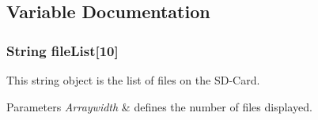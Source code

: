 \subsection{Variable Documentation}
\hypertarget{_c_n_c_interface_8ino_a5a05dbbdadb25aa91e63ea51a8a2ec14}{
\subsubsection[{file\-List}]{\setlength{\rightskip}{0pt plus 5cm}String file\-List\mbox{[}10\mbox{]}}}\label{_c_n_c_interface_8ino_a5a05dbbdadb25aa91e63ea51a8a2ec14}


This string object is the list of files on the S\-D-\/\-Card. 


\begin{DoxyParams}{Parameters}
{\em Arraywidth} & defines the number of files displayed. \\
\hline
\end{DoxyParams}

